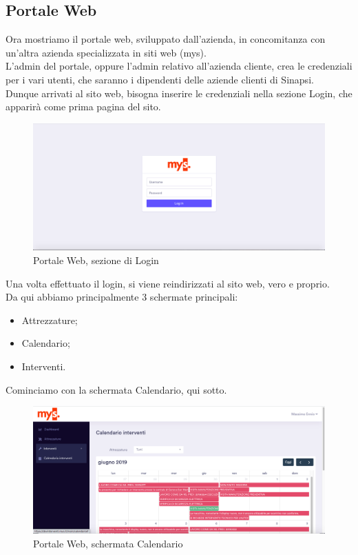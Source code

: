 \subsection{Portale Web}
Ora mostriamo il portale web, sviluppato dall'azienda, in concomitanza con un'altra azienda specializzata in siti web (mys).\\
L'admin del portale, oppure l'admin relativo all'azienda cliente, crea le credenziali per i vari utenti, che saranno i dipendenti delle aziende clienti di Sinapsi.\\
Dunque arrivati al sito web, bisogna inserire le credenziali nella sezione Login, che apparirà come prima pagina del sito.\\
\begin{figure}[!h] 
	\centering 
	\includegraphics[scale = 0.6]{immagini/portale/login.png} 
	\caption {Portale Web, sezione di Login}
\end{figure}
Una volta effettuato il login, si viene reindirizzati al sito web, vero e proprio.\\
Da qui abbiamo principalmente 3 schermate principali:
\begin{itemize}
	\item Attrezzature;
	\item Calendario;
	\item Interventi.
\end{itemize}
Cominciamo con la schermata Calendario, qui sotto.
\begin{figure}[!h] 
	\centering 
	\includegraphics[scale = 0.6]{immagini/portale/calendario.png} 
	\caption {Portale Web, schermata Calendario}
\end{figure}

